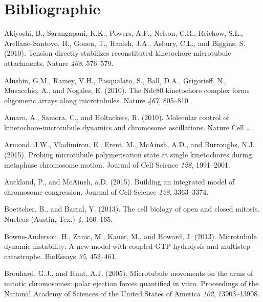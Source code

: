 \documentclass[12pt,a4paper,twoside,openright]{book}
\begin{document}
\clearpage\null

\backmatter

\chapter{Bibliographie}\label{bibliographie}



\hypertarget{refs}{}
\hypertarget{ref-Akiyoshi2010}{}
Akiyoshi, B., Sarangapani, K.K., Powers, A.F., Nelson, C.R., Reichow,
S.L., Arellano-Santoyo, H., Gonen, T., Ranish, J.A., Asbury, C.L., and
Biggins, S. (2010). Tension directly stabilizes reconstituted
kinetochore-microtubule attachments. Nature \emph{468}, 576--579.

\hypertarget{ref-Alushin2010}{}
Alushin, G.M., Ramey, V.H., Pasqualato, S., Ball, D.A., Grigorieff, N.,
Musacchio, A., and Nogales, E. (2010). The Ndc80 kinetochore complex
forms oligomeric arrays along microtubules. Nature \emph{467}, 805--810.

\hypertarget{ref-Amaro2010a}{}
Amaro, A., Samora, C., and Holtackers, R. (2010). Molecular control of
kinetochore-microtubule dynamics and chromosome oscillations. Nature
Cell \ldots{}.

\hypertarget{ref-Armond2015}{}
Armond, J.W., Vladimirou, E., Erent, M., McAinsh, A.D., and Burroughs,
N.J. (2015). Probing microtubule polymerisation state at single
kinetochores during metaphase chromosome motion. Journal of Cell Science
\emph{128}, 1991--2001.

\hypertarget{ref-Auckland2015a}{}
Auckland, P., and McAinsh, a.D. (2015). Building an integrated model of
chromosome congression. Journal of Cell Science \emph{128}, 3363--3374.

\hypertarget{ref-Boettcher2013}{}
Boettcher, B., and Barral, Y. (2013). The cell biology of open and
closed mitosis. Nucleus (Austin, Tex.) \emph{4}, 160--165.

\hypertarget{ref-Bowne-Anderson2013}{}
Bowne-Anderson, H., Zanic, M., Kauer, M., and Howard, J. (2013).
Microtubule dynamic instability: A new model with coupled GTP hydrolysis
and multistep catastrophe. BioEssays \emph{35}, 452--461.

\hypertarget{ref-Brouhard2005}{}
Brouhard, G.J., and Hunt, A.J. (2005). Microtubule movements on the arms
of mitotic chromosomes: polar ejection forces quantified in vitro.
Proceedings of the National Academy of Sciences of the United States of
America \emph{102}, 13903--13908.
\end{document}
